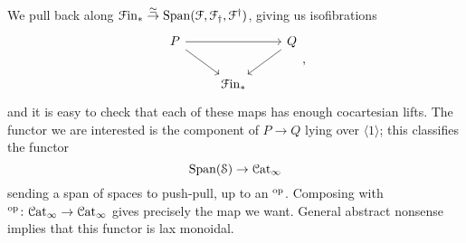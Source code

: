 \documentclass[main.tex]{subfiles}
\begin{document}
We pull back along $\mathcal{F}\mathrm{in}_{*} \overset{\simeq}{\to} \mathrm{Span}(\mathcal{F}, \mathcal{F}_{\dagger}, \mathcal{F}^{\dagger})$, giving us isofibrations
\begin{equation*}
  \begin{tikzcd}
    P
    \arrow[rr]
    \arrow[dr]
    && Q
    \arrow[dl]
    \\
    & \Finp
  \end{tikzcd},
\end{equation*}
and it is easy to check that each of these maps has enough cocartesian lifts. The functor we are interested is the component of $P \to Q$ lying over $\langle 1 \rangle$; this classifies the functor
\begin{equation*}
  \mathrm{Span}(\mathcal{S}) \to \mathcal{C}\mathrm{at}_{\infty}
\end{equation*}
sending a span of spaces to push-pull, up to an $^{\mathrm{op}}$. Composing with $^{\mathrm{op}}\colon \mathcal{C}\mathrm{at}_{\infty} \to \mathcal{C}\mathrm{at}_{\infty}$ gives precisely the map we want. General abstract nonsense implies that this functor is lax monoidal.
\end{document}

